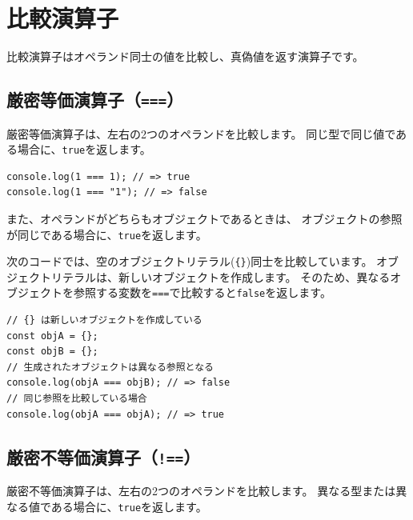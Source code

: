 \hypertarget{comparison-operator}{%
\section{比較演算子}\label{comparison-operator}}

比較演算子はオペランド同士の値を比較し、真偽値を返す演算子です。

\hypertarget{strict-equal-operator}{%
\subsection{\texorpdfstring{厳密等価演算子（\texttt{===}）}{厳密等価演算子（===）}}\label{strict-equal-operator}}

厳密等価演算子は、左右の2つのオペランドを比較します。
同じ型で同じ値である場合に、\texttt{true}を返します。

\begin{lstlisting}
console.log(1 === 1); // => true
console.log(1 === "1"); // => false
\end{lstlisting}

また、オペランドがどちらもオブジェクトであるときは、
オブジェクトの参照が同じである場合に、\texttt{true}を返します。

次のコードでは、空のオブジェクトリテラル(\texttt{\{\}})同士を比較しています。
オブジェクトリテラルは、新しいオブジェクトを作成します。
そのため、異なるオブジェクトを参照する変数を\texttt{===}で比較すると\texttt{false}を返します。

\begin{lstlisting}
// {} は新しいオブジェクトを作成している
const objA = {};
const objB = {};
// 生成されたオブジェクトは異なる参照となる
console.log(objA === objB); // => false
// 同じ参照を比較している場合
console.log(objA === objA); // => true
\end{lstlisting}

\hypertarget{strict-not-equal-operator}{%
\subsection{\texorpdfstring{厳密不等価演算子（\texttt{!==}）}{厳密不等価演算子（!==）}}\label{strict-not-equal-operator}}

厳密不等価演算子は、左右の2つのオペランドを比較します。
異なる型または異なる値である場合に、\texttt{true}を返します。

